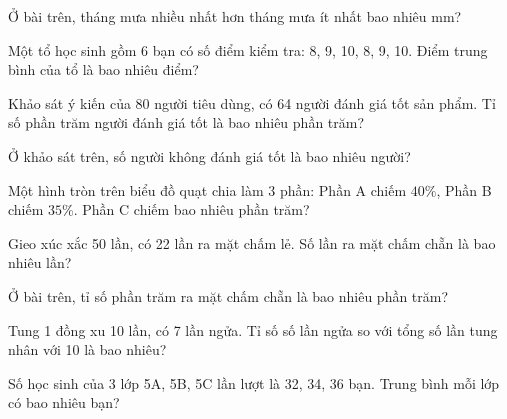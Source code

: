 \begin{ex}
  Ở bài trên, tháng mưa nhiều nhất hơn tháng mưa ít nhất bao nhiêu mm?
\end{ex}

\begin{ex}
  Một tổ học sinh gồm 6 bạn có số điểm kiểm tra: 8, 9, 10, 8, 9, 10. Điểm trung bình của tổ là bao nhiêu điểm?
\end{ex}

\begin{ex}
  Khảo sát ý kiến của 80 người tiêu dùng, có 64 người đánh giá tốt sản phẩm. Tỉ số phần trăm người đánh giá tốt là bao nhiêu phần trăm?
\end{ex}

\begin{ex}
  Ở khảo sát trên, số người không đánh giá tốt là bao nhiêu người?
\end{ex}

\begin{ex}
  Một hình tròn trên biểu đồ quạt chia làm 3 phần: Phần A chiếm $40\%$, Phần B chiếm $35\%$. Phần C chiếm bao nhiêu phần trăm?
\end{ex}

\begin{ex}
  Gieo xúc xắc 50 lần, có 22 lần ra mặt chấm lẻ. Số lần ra mặt chấm chẵn là bao nhiêu lần?
\end{ex}

\begin{ex}
  Ở bài trên, tỉ số phần trăm ra mặt chấm chẵn là bao nhiêu phần trăm?
\end{ex}

\begin{ex}
  Tung 1 đồng xu 10 lần, có 7 lần ngửa. Tỉ số số lần ngửa so với tổng số lần tung nhân với 10 là bao nhiêu?
\end{ex}

\begin{ex}
  Số học sinh của 3 lớp 5A, 5B, 5C lần lượt là 32, 34, 36 bạn. Trung bình mỗi lớp có bao nhiêu bạn?
\end{ex}
